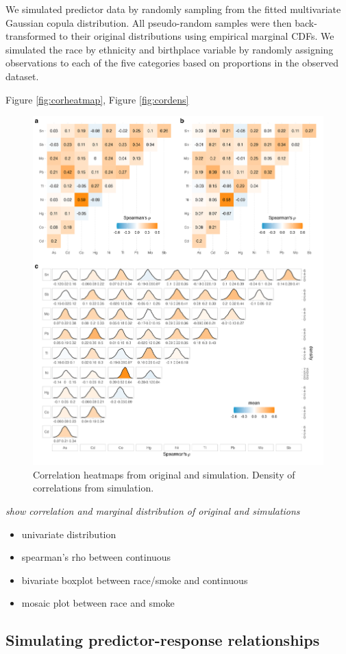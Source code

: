 \documentclass[12pt, twoside]{amherstthesis}
\providecommand{\tightlist}{%
  \setlength{\itemsep}{0pt}\setlength{\parskip}{0pt}}
\begin{document}
We simulated predictor data by randomly sampling from the fitted multivariate Gaussian copula distribution. All pseudo-random samples were then back-transformed to their original distributions using empirical marginal CDFs. We simulated the race by ethnicity and birthplace variable by randomly assigning observations to each of the five categories based on proportions in the observed dataset.

Figure \ref{fig:corheatmap}, Figure \ref{fig:cordens}
\begin{figure}

{\centering \includegraphics[width=1\linewidth]{figures/ch4_corr_simorigdens} 

}

\caption{Correlation heatmaps from original and simulation. Density of correlations from simulation.}\label{fig:corsims}
\end{figure}
\emph{show correlation and marginal distribution of original and simulations}
\begin{itemize}
\tightlist
\item
  univariate distribution
\item
  spearman's rho between continuous
\item
  bivariate boxplot between race/smoke and continuous
\item
  mosaic plot between race and smoke
\end{itemize}
\hypertarget{simresp}{%
\subsection{Simulating predictor-response relationships}\label{simresp}}
\end{document}
